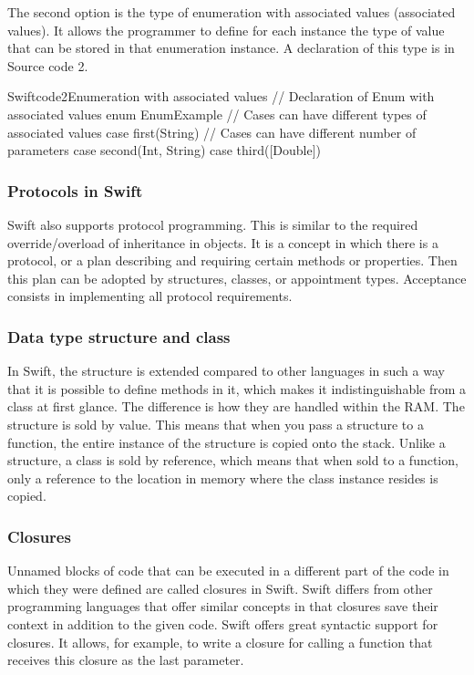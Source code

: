 \documentclass[
  language=english,
  figures=false,
  sourcecodes,
  index
]{kidiplom}
\begin{document}
The second option is the type of enumeration with associated values (associated values). It allows the programmer to define for each instance the type of value that can be stored in that enumeration instance. A declaration of this type is in Source code 2.

\begin{kicode}{Swift}{code2}{Enumeration with associated values}
// Declaration of Enum with associated values
enum EnumExample {
// Cases can have different types of associated values
	case first(String)
// Cases can have different number of parameters
	 case second(Int, String)
	 case third([Double])
}
\end{kicode}

\subsubsection{Protocols in Swift}
Swift also supports protocol programming. This is similar to the required override/overload of inheritance in objects. It is a concept in which there is a protocol, or a plan describing and requiring certain methods or properties. Then this plan can be adopted by structures, classes, or appointment types. Acceptance consists in implementing all protocol requirements.

\subsubsection{Data type structure and class}
In Swift, the structure is extended compared to other languages in such a way that it is possible to define methods in it, which makes it indistinguishable from a class at first glance. The difference is how they are handled within the RAM. The structure is sold by value. This means that when you pass a structure to a function, the entire instance of the structure is copied onto the stack. Unlike a structure, a class is sold by reference, which means that when sold to a function, only a reference to the location in memory where the class instance resides is copied.

\subsubsection{Closures}
Unnamed blocks of code that can be executed in a different part of the code in which they were defined are called closures in Swift. Swift differs from other programming languages that offer similar concepts in that closures save their context in addition to the given code. Swift offers great syntactic support for closures. It allows, for example, to write a closure for calling a function that receives this closure as the last parameter.
\end{document}
